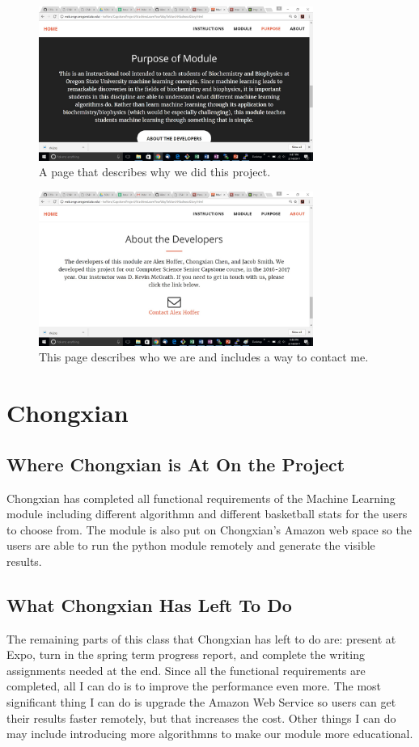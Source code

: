 \documentclass[onecolumn, draftclsnofoot,10pt, compsoc]{IEEEtran}
\begin{document}
\begin{figure}[H]
\centering
\includegraphics[width=0.8\textwidth]{images/Purpose}
\caption{A page that describes why we did this project.}
\label{fig4}
\end{figure}

\begin{figure}[H]
\centering
\includegraphics[width=0.8\textwidth]{images/About}
\caption{This page describes who we are and includes a way to contact me.}
\label{fig5}
\end{figure}


\section{Chongxian}
\subsection{Where Chongxian is At On the Project}
Chongxian has completed all functional requirements of the Machine Learning module including different algorithmn and different basketball stats for the users to choose from. The module is also put on Chongxian's Amazon web space so the users are able to run the python module remotely and generate the visible results. 

\subsection{What Chongxian Has Left To Do}
The remaining parts of this class that Chongxian has left to do are: present at Expo, turn in the spring term progress report, and complete the writing assignments needed at the end. Since all the functional requirements are completed, all I can do is to improve the performance even more. The most significant thing I can do is upgrade the Amazon Web Service so users can get their results faster remotely, but that increases the cost. Other things I can do may include introducing more algorithmns to make our module more educational.
\end{document}
